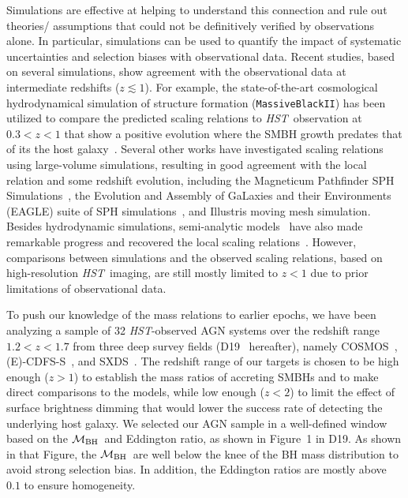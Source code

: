 \documentclass{natureprintstyle}
\newcommand{\hst}{{\it HST}}
\newcommand{\mbh}{$\mathcal M_{\rm BH}$}
\begin{document}
Simulations are effective at helping to understand this connection and rule out theories/ assumptions that could not be definitively verified by observations alone. In particular, simulations can be used to quantify the impact of systematic uncertainties and selection biases with observational data. Recent studies, based on several simulations, show agreement with the observational data at intermediate redshifts ($z\lesssim1$). For example, the state-of-the-art cosmological hydrodynamical simulation of structure formation (\texttt{MassiveBlackII}) has been utilized to compare the predicted scaling relations to \hst\ observation at $0.3<z<1$ that show a positive evolution where the SMBH growth predates that of its the host galaxy~\cite{DeG++15}. Several other works have investigated scaling relations using large-volume simulations, resulting in good agreement with the local relation and some redshift evolution, including the Magneticum Pathfinder SPH Simulations~\cite{Steinborn2015}, the Evolution and Assembly of GaLaxies and their Environments (EAGLE) suite of SPH simulations~\cite{Schaye2015}, and Illustris moving mesh simulation\cite{Sijacki2015, Vogelsberger2014, Li2019}. Besides hydrodynamic simulations, semi-analytic models~\cite{Menci2014, Menci2016} have also made remarkable progress and recovered the local scaling relations~\cite{Kormendy13}. However, comparisons between simulations and the observed scaling relations, based on high-resolution \hst\ imaging, are still mostly limited to $z<1$ due to prior limitations of observational data.

To push our knowledge of the mass relations to earlier epochs, we have been analyzing a sample of 32 \hst-observed AGN systems over the redshift range $1.2<z<1.7$ from three deep survey fields (D19~\cite{Ding2019} hereafter), namely COSMOS~\cite{Civano2016}, (E)-CDFS-S~\cite{Lehmer2005, Xue2011}, and SXDS~\cite{Ueda2008}. The redshift range of our targets is chosen to be high enough ($z>1$) to establish the mass ratios of accreting SMBHs and to make direct comparisons to the models, while low enough ($z<2$) to limit the effect of surface brightness dimming that would lower the success rate of detecting the underlying host galaxy. 
We selected our AGN sample in a well-defined window based on the \mbh\ and Eddington ratio, as shown in Figure~1 in D19. As shown in that Figure, the \mbh\ are well below the knee of the BH mass distribution to avoid strong selection bias. In addition, the Eddington ratios are mostly above $0.1$ to ensure homogeneity.
\end{document}
